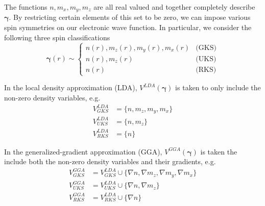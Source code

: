 \documentclass[11pt]{article}
\newcommand{\opdm}[0]{\boldsymbol{\gamma}}
\begin{document}
The functions $n,m_x,m_y,m_z$ are all real valued and together completely 
describe $\opdm$. By restricting certain elements of this set to be zero,
we can impose various spin symmetries on our electronic wave function. In
particular, we consider the following three spin classifications
\begin{equation}
\opdm(r) \sim \begin{cases}
n(r), m_z(r), m_y(r), m_x(r) & \text{(GKS)} \\
n(r), m_z(r)                 & \text{(UKS)} \\
n(r)                         & \text{(RKS)}
\end{cases}
\end{equation}


In the local density approximation (LDA), $V^{LDA}(\opdm)$ is taken to only include
the non-zero density variables, e.g.
\begin{align}
V^{LDA}_{GKS} &= \{ n, m_z, m_y, m_x \} \nonumber \\
V^{LDA}_{UKS} &= \{ n, m_z \} \\
V^{LDA}_{RKS} &= \{ n \} \nonumber
\end{align}

In the generalized-gradient approximation (GGA), $V^{GGA}(\opdm)$ is taken the include
both the non-zero density variables and their gradients, e.g.
\begin{align}
V^{GGA}_{GKS} &= V^{LDA}_{GKS} \cup \{ \nabla n, \nabla m_z, \nabla m_y, \nabla m_x \} \nonumber \\
V^{GGA}_{UKS} &= V^{LDA}_{UKS} \cup \{ \nabla n, \nabla m_z \} \\
V^{GGA}_{RKS} &= V^{LDA}_{RKS} \cup \{ \nabla n \} \nonumber
\end{align}
\end{document}
